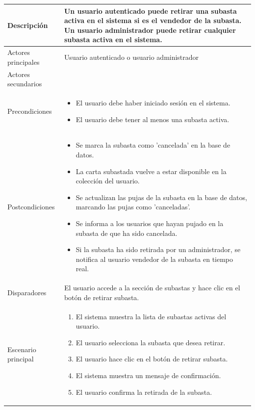 \begin{longtable}{
    >{\columncolor{lightgreen!20}}p{4cm}
    p{12cm}
    }
    \midrule
    Descripción & Un usuario autenticado puede retirar una subasta activa en el sistema si es el vendedor de la subasta. Un usuario administrador puede retirar cualquier subasta activa en el sistema. \\
    \midrule
    Actores principales & Usuario autenticado o usuario administrador \\
    \midrule
    Actores secundarios &  \\
    \midrule
    Precondiciones & \begin{itemize}[nosep,leftmargin=*]
        \item El usuario debe haber iniciado sesión en el sistema.
        \item El usuario debe tener al menos una subasta activa.
    \end{itemize} \\
    \midrule
    Postcondiciones & \begin{itemize}[nosep,leftmargin=*]
        \item Se marca la subasta como 'cancelada' en la base de datos.
        \item La carta subastada vuelve a estar disponible en la colección del usuario.
        \item Se actualizan las pujas de la subasta en la base de datos, marcando las pujas como 'canceladas'.
        \item Se informa a los usuarios que hayan pujado en la subasta de que ha sido cancelada.
        \item Si la subasta ha sido retirada por un administrador, se notifica al usuario vendedor de la subasta en tiempo real.
    \end{itemize} \\
    \midrule
    Disparadores & El usuario accede a la sección de subastas y hace clic en el botón de retirar subasta. \\
    \midrule
    Escenario principal & \begin{enumerate}[nosep,leftmargin=*]
        \item El sistema muestra la lista de subastas activas del usuario.
        \item El usuario selecciona la subasta que desea retirar.
        \item El usuario hace clic en el botón de retirar subasta.
        \item El sistema muestra un mensaje de confirmación.
        \item El usuario confirma la retirada de la subasta.

\end{enumerate}
\end{longtable}
